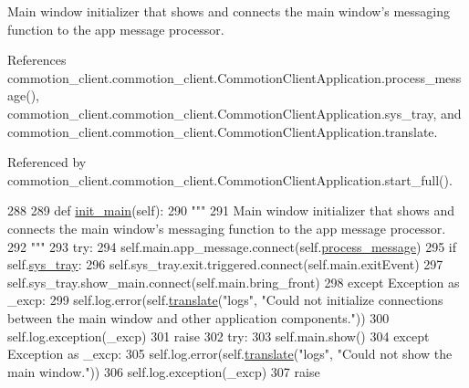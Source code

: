 \begin{DoxyVerb}Main window initializer that shows and connects the main window's messaging function to the app message processor.
\end{DoxyVerb}
 

References commotion\+\_\+client.\+commotion\+\_\+client.\+Commotion\+Client\+Application.\+process\+\_\+message(), commotion\+\_\+client.\+commotion\+\_\+client.\+Commotion\+Client\+Application.\+sys\+\_\+tray, and commotion\+\_\+client.\+commotion\+\_\+client.\+Commotion\+Client\+Application.\+translate.



Referenced by commotion\+\_\+client.\+commotion\+\_\+client.\+Commotion\+Client\+Application.\+start\+\_\+full().


\begin{DoxyCode}
288 
289     \textcolor{keyword}{def }\hyperlink{classcommotion__client_1_1commotion__client_1_1CommotionClientApplication_a1ed67f317a1ddd84b65ef39a848732bf}{init\_main}(self):
290         \textcolor{stringliteral}{"""}
291 \textcolor{stringliteral}{        Main window initializer that shows and connects the main window's messaging function to the app
       message processor.}
292 \textcolor{stringliteral}{        """}
293         \textcolor{keywordflow}{try}:
294             self.main.app\_message.connect(self.\hyperlink{classcommotion__client_1_1commotion__client_1_1CommotionClientApplication_a981d54a4d40a4345a253be2b2a541127}{process\_message})
295             \textcolor{keywordflow}{if} self.\hyperlink{classcommotion__client_1_1commotion__client_1_1CommotionClientApplication_a48a8bf39339f834c94353ca68444176f}{sys\_tray}:
296                 self.sys\_tray.exit.triggered.connect(self.main.exitEvent)
297                 self.sys\_tray.show\_main.connect(self.main.bring\_front)
298         \textcolor{keywordflow}{except} Exception \textcolor{keyword}{as} \_excp:
299             self.log.error(self.\hyperlink{classcommotion__client_1_1commotion__client_1_1CommotionClientApplication_a57e951c9b241fb0e0c70055b4ca1b6f7}{translate}(\textcolor{stringliteral}{"logs"}, \textcolor{stringliteral}{"Could not initialize connections between the
       main window and other application components."}))
300             self.log.exception(\_excp)
301             \textcolor{keywordflow}{raise}
302         \textcolor{keywordflow}{try}:
303             self.main.show()
304         \textcolor{keywordflow}{except} Exception \textcolor{keyword}{as} \_excp:
305             self.log.error(self.\hyperlink{classcommotion__client_1_1commotion__client_1_1CommotionClientApplication_a57e951c9b241fb0e0c70055b4ca1b6f7}{translate}(\textcolor{stringliteral}{"logs"}, \textcolor{stringliteral}{"Could not show the main window."}))
306             self.log.exception(\_excp)
307             \textcolor{keywordflow}{raise}

\end{DoxyCode}
